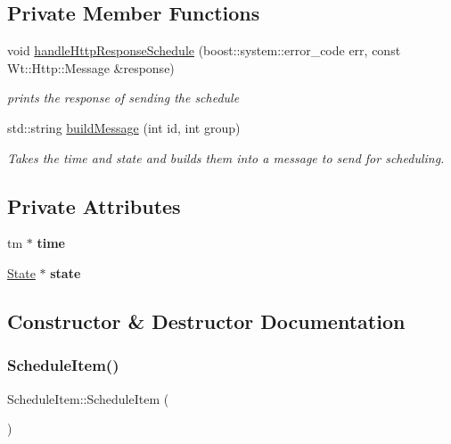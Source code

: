 \subsection*{Private Member Functions}
\begin{DoxyCompactItemize}
\item 
void \hyperlink{class_schedule_item_af80dc4ae6e2c7400ed74572621d40739}{handle\+Http\+Response\+Schedule} (boost\+::system\+::error\+\_\+code err, const Wt\+::\+Http\+::\+Message \&response)
\begin{DoxyCompactList}\small\item\em prints the response of sending the schedule \end{DoxyCompactList}\item 
std\+::string \hyperlink{class_schedule_item_a87e1755a000149294aec8ef4b4a950d1}{build\+Message} (int id, int group)
\begin{DoxyCompactList}\small\item\em Takes the time and state and builds them into a message to send for scheduling. \end{DoxyCompactList}\end{DoxyCompactItemize}
\subsection*{Private Attributes}
\begin{DoxyCompactItemize}
\item 
\mbox{\label{class_schedule_item_aa5f976a7e2bb9880337860ab2488c88f}} 
tm $\ast$ {\bfseries time}
\item 
\mbox{\label{class_schedule_item_ac450f2dce58d66ce77c2f4ed357c42d8}} 
\hyperlink{class_state}{State} $\ast$ {\bfseries state}
\end{DoxyCompactItemize}


\subsection{Constructor \& Destructor Documentation}
\mbox{\label{class_schedule_item_a8cbba55bd38a4f68bdec8c6d854a9359}} 
\subsubsection{\texorpdfstring{Schedule\+Item()}{ScheduleItem()}}
{\footnotesize\ttfamily Schedule\+Item\+::\+Schedule\+Item (\begin{DoxyParamCaption}{ }\end{DoxyParamCaption})}



